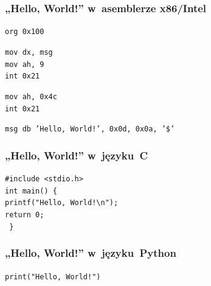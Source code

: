 \documentclass[10pt,t]{beamer}
\begin{document}
\begin{frame}
  \frametitle{„Hello, World!” w~asemblerze x86/Intel
    \parencite{Anonymous-Hello-World-in-x86-Assembly-Language}}


  \texttt{org 0x100} \\
  \vspace{0.8em}

  \texttt{mov dx, msg} \\
  \texttt{mov ah, 9} \\
  \texttt{int 0x21} \\
  \vspace{0.8em}

  \texttt{mov ah, 0x4c} \\
  \texttt{int 0x21} \\
  \vspace{0.8em}

  \texttt{msg db 'Hello, World!', 0x0d, 0x0a, '\$'}

\end{frame}





\begin{frame}
  \frametitle{„Hello, World!” w~języku~C}


  \texttt{\#include <stdio.h>} \\
  \vspace{0.8em}
  \texttt{int main() \{ } \\
  \hphantom{aaaa} \texttt{printf("Hello, World!\textbackslash n");} \\
  \vspace{0.8em}
  \vspace{0.8em}
  \vspace{0.8em}
  \vspace{0.8em}
  \hphantom{aaaa} \texttt{return 0;} \\
  \texttt{ \} }

\end{frame}





\begin{frame}
  \frametitle{„Hello, World!” w~języku~Python}


  \texttt{print("Hello, World!")}

\end{frame}
\end{document}
